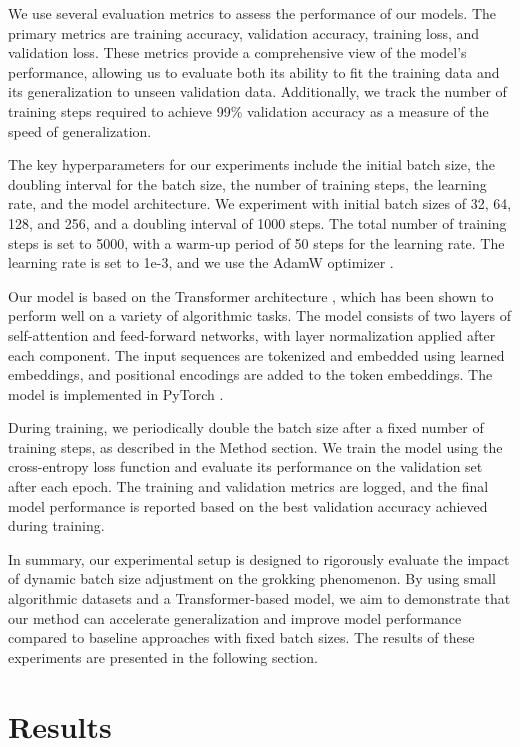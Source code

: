 \documentclass{article} %
\begin{document}
We use several evaluation metrics to assess the performance of our models. The primary metrics are training accuracy, validation accuracy, training loss, and validation loss. These metrics provide a comprehensive view of the model's performance, allowing us to evaluate both its ability to fit the training data and its generalization to unseen validation data. Additionally, we track the number of training steps required to achieve 99\% validation accuracy as a measure of the speed of generalization.

The key hyperparameters for our experiments include the initial batch size, the doubling interval for the batch size, the number of training steps, the learning rate, and the model architecture. We experiment with initial batch sizes of 32, 64, 128, and 256, and a doubling interval of 1000 steps. The total number of training steps is set to 5000, with a warm-up period of 50 steps for the learning rate. The learning rate is set to 1e-3, and we use the AdamW optimizer \citep{loshchilov2017adamw}.

Our model is based on the Transformer architecture \citep{vaswani2017attention}, which has been shown to perform well on a variety of algorithmic tasks. The model consists of two layers of self-attention and feed-forward networks, with layer normalization \citep{ba2016layer} applied after each component. The input sequences are tokenized and embedded using learned embeddings, and positional encodings are added to the token embeddings. The model is implemented in PyTorch \citep{paszke2019pytorch}.

During training, we periodically double the batch size after a fixed number of training steps, as described in the Method section. We train the model using the cross-entropy loss function and evaluate its performance on the validation set after each epoch. The training and validation metrics are logged, and the final model performance is reported based on the best validation accuracy achieved during training.

In summary, our experimental setup is designed to rigorously evaluate the impact of dynamic batch size adjustment on the grokking phenomenon. By using small algorithmic datasets and a Transformer-based model, we aim to demonstrate that our method can accelerate generalization and improve model performance compared to baseline approaches with fixed batch sizes. The results of these experiments are presented in the following section.

\section{Results}
\label{sec:results}
\end{document}
